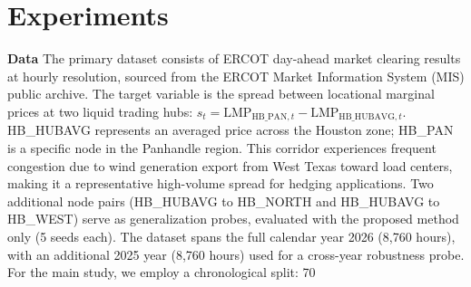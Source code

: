 \section{Experiments}
\textbf{Data}
The primary dataset consists of ERCOT day-ahead market clearing results at hourly resolution, sourced from the ERCOT Market Information System (MIS) public archive. The target variable is the spread between locational marginal prices at two liquid trading hubs: $s_t = \text{LMP}_{\text{HB\_PAN},t} - \text{LMP}_{\text{HB\_HUBAVG},t}$. HB_HUBAVG represents an averaged price across the Houston zone; HB_PAN is a specific node in the Panhandle region. This corridor experiences frequent congestion due to wind generation export from West Texas toward load centers, making it a representative high-volume spread for hedging applications. Two additional node pairs (HB_HUBAVG to HB_NORTH and HB_HUBAVG to HB_WEST) serve as generalization probes, evaluated with the proposed method only (5 seeds each).
The dataset spans the full calendar year 2026 (8,760 hours), with an additional 2025 year (8,760 hours) used for a cross-year robustness probe. For the main study, we employ a chronological split: 70%
